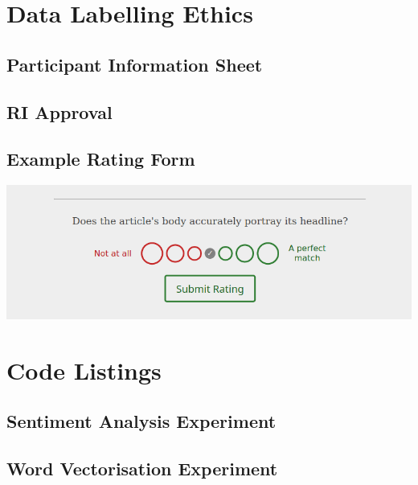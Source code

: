 \documentclass[12pt,a4paper]{article}
\begin{document}
\begin{appendices}
\section{Data Labelling Ethics}


\begin{subappendices}
\subsection{Participant Information Sheet} \label{app:ethics-participant-info}


\subsection{RI Approval} \label{app:ethics-approval}






\subsection{Example Rating Form} \label{app:rating-form}
\includegraphics[scale=0.5]{../docs/ethics/example_rating-just-form}
\end{subappendices}

\section{Code Listings}
\begin{subappendices}
\subsection{Sentiment Analysis Experiment} \label{app:sentiment-analysis}


\subsection{Word Vectorisation Experiment} \label{app:vectorisation}

\end{subappendices}


\end{appendices}
\end{document}
